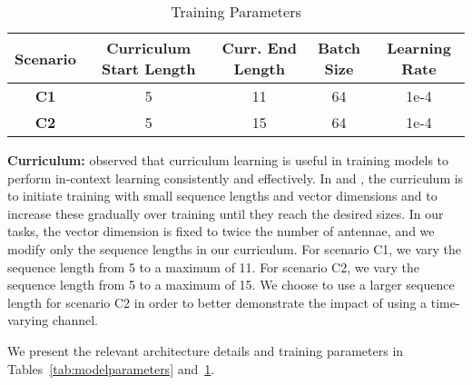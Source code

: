 \documentclass[journal,letterpaper,onecolumn]{IEEEtran}
\begin{document}
\begin{table}[ht]
    \centering
    \begin{tabular}{|c|c|c|c|c|}
         \hline
         \textbf{Scenario}& \textbf{Curriculum Start Length} & \textbf{Curr. End Length} & \textbf{Batch Size} & \textbf{Learning Rate} \\
         \hline
         \textbf{C1} & 5 & 11 & 64 & 1e-4 \\
         \hline
         \textbf{C2} & 5 & 15 & 64 & 1e-4 \\
         \hline
    \end{tabular}
    \vspace{2pt}
    \caption{Training Parameters}
    \label{tab:trainingparameters}
\end{table}

\textbf{Curriculum:} \cite{garg2023transformers} observed that curriculum learning is useful in training models to perform in-context learning consistently and effectively.
In \cite{garg2023transformers} and \cite{ahuja2023incontext}, the curriculum is to initiate training with small sequence lengths and vector dimensions and to increase these gradually over training until they reach the desired sizes. In our tasks, the vector dimension is fixed to twice the number of antennae,
and we modify only the sequence lengths in our curriculum. For scenario C1, we vary the sequence length from 5 to a maximum of 11. For scenario C2, we vary the sequence length from 5 to a maximum of 15. We choose to use a larger sequence length for scenario C2 in order to better demonstrate the impact of using a time-varying channel.

We present the relevant architecture details and training parameters in Tables~\ref{tab:modelparameters} and~\ref{tab:trainingparameters}.
\end{document}
